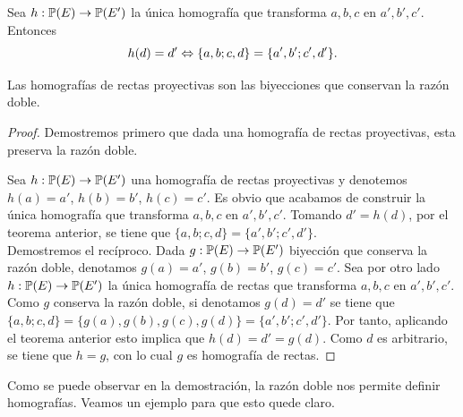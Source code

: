  Sea $h:\mathbb{P}(E)\rightarrow \mathbb{P}(E')$ la única  homografía que transforma $a,b,c$ en $a',b',c'$. Entonces 
\begin{equation}
		h(d)=d' \Leftrightarrow \{a,b;c,d\}=\{a',b';c',d'\}.
\end{equation}
\begin{cor}
	Las homografías de rectas proyectivas son las biyecciones que conservan la razón doble.
\end{cor}
\begin{proof}
	Demostremos primero que dada una homografía de rectas proyectivas, esta preserva la razón doble. 
	
	Sea $h:\mathbb{P}(E)\rightarrow \mathbb{P}(E')$ una homografía de rectas proyectivas y denotemos $h(a)=a'$, $h(b)=b'$, $h(c)=c'$. Es obvio que acabamos de construir la única homografía que transforma $a,b,c$ en $a',b',c'$. Tomando $d'=h(d)$, por el teorema anterior, se tiene que $\{a,b;c,d\}=\{a',b';c',d'\}$.\\
	
	Demostremos el recíproco. Dada $g:\mathbb{P}(E)\rightarrow \mathbb{P}(E')$ biyección que conserva la razón doble, denotamos $g(a)=a'$, $g(b)=b'$, $g(c)=c'$. Sea por otro lado $h:\mathbb{P}(E)\rightarrow \mathbb{P}(E')$ la única homografía de rectas que transforma $a,b,c$ en $a',b',c'$. Como $g$ conserva la razón doble, si denotamos $g(d)=d'$ se tiene que $\{a,b;c,d\}= \{g(a),g(b),g(c),g(d)\}=\{a',b';c',d'\}$. Por tanto, aplicando el teorema anterior esto implica que $h(d)=d'=g(d)$. Como $d$ es arbitrario, se tiene que $h=g$, con lo cual $g$ es homografía de rectas.
\end{proof}
Como se puede observar en la demostración, la razón doble nos permite definir homografías. Veamos un ejemplo para que esto quede claro.
